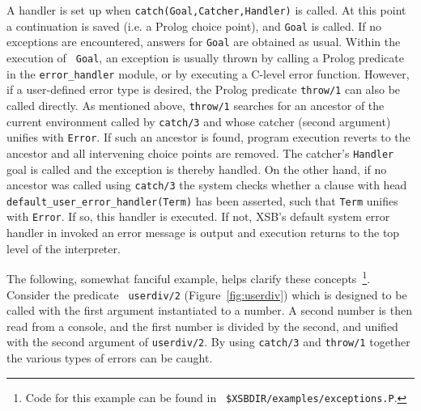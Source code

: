 A handler is set up when {\tt catch(Goal,Catcher,Handler)} is called.
At this point a continuation is saved (i.e. a Prolog choice point),
and {\tt Goal} is called.  If no exceptions are encountered, answers
for {\tt Goal} are obtained as usual.  Within the execution of {\tt
  Goal}, an exception is usually thrown by calling a Prolog predicate
in the {\tt error\_handler} module, or by executing a C-level error
function.  However, if a user-defined error type is desired, the
Prolog predicate {\tt throw/1} can also be called directly.  As
mentioned above, {\tt throw/1} searches for an ancestor of the current
environment called by {\tt catch/3} and whose catcher (second
argument) unifies with {\tt Error}.  If such an ancestor is found,
program execution reverts to the ancestor and all intervening choice
points are removed.  The catcher's {\tt Handler} goal is called and
the exception is thereby handled.  On the other hand, if no ancestor
was called using {\tt catch/3} the system checks whether a clause with
head {\tt default\_user\_error\_handler(Term)} has been asserted, such
that {\tt Term} unifies with {\tt Error}.  If so, this handler is
executed.  If not, XSB's default system error handler in invoked an
error message is output and execution returns to the top level of the
interpreter.

The following, somewhat fanciful example, helps clarify these
concepts~\footnote{Code for this example can be found in {\tt
\$XSBDIR/examples/exceptions.P}.}.  Consider the predicate {\tt
userdiv/2} (Figure~\ref{fig:userdiv}) which is designed to be called
with the first argument instantiated to a number.  A second number is
then read from a console, and the first number is divided by the
second, and unified with the second argument of {\tt userdiv/2}.  By
using {\tt catch/3} and {\tt throw/1} together the various types of
errors can be caught.

